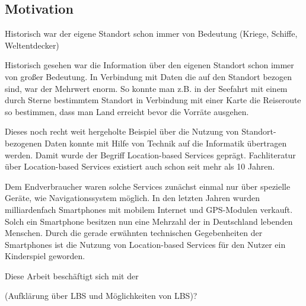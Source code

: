 \subsection{Motivation}

Historisch war der eigene Standort schon immer von Bedeutung (Kriege, Schiffe, Weltentdecker) 

Historisch gesehen war die Information über den eigenen Standort schon immer von großer Bedeutung. In Verbindung mit Daten die auf den Standort bezogen sind, war der Mehrwert enorm. So konnte man z.B. in der Seefahrt mit einem durch Sterne bestimmtem Standort in Verbindung mit einer Karte die Reiseroute so bestimmen, dass man Land erreicht bevor die Vorräte ausgehen.

Dieses noch recht weit hergeholte Beispiel über die Nutzung von Standort-bezogenen Daten konnte mit Hilfe von Technik auf die Informatik übertragen werden. Damit wurde der Begriff Location-based Services geprägt. Fachliteratur über Location-based Services existiert auch schon seit mehr als 10 Jahren. 

Dem Endverbraucher waren solche Services zunächst einmal nur über spezielle Geräte, wie Navigationssystem möglich. In den letzten Jahren wurden milliardenfach Smartphones mit mobilem Internet und GPS-Modulen verkauft. Solch ein Smartphone besitzen nun eine Mehrzahl der in Deutschland lebenden Menschen. Durch die gerade erwähnten technischen Gegebenheiten der Smartphones ist die Nutzung von Location-based Services für den Nutzer ein Kinderspiel geworden. 

Diese Arbeit beschäftigt sich mit der 

(Aufklärung über LBS und Möglichkeiten von LBS)?
\newpage